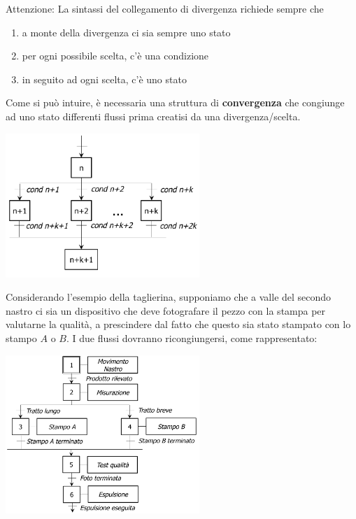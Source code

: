 \documentclass[10pt, letterpaper]{report}
\begin{document}
Attenzione: La sintassi del collegamento di divergenza richiede sempre che \begin{enumerate}
    \item a monte della divergenza ci sia sempre uno stato 
    \item per ogni possibile scelta, c'è una condizione 
    \item in seguito ad ogni scelta, c'è uno stato
\end{enumerate}
Come si può intuire, è necessaria una struttura di \textbf{convergenza} che congiunge ad uno stato differenti flussi prima creatisi da una divergenza/scelta.
\begin{center}
    \includegraphics[width=0.55\textwidth ]{images/convergenza.png}
\end{center}
Considerando l'esempio della taglierina, supponiamo che a valle del secondo nastro ci sia un dispositivo che deve fotografare il pezzo con la stampa per valutarne la qualità, a prescindere dal fatto che questo sia stato stampato con lo stampo $A$ o $B$. I due flussi dovranno ricongiungersi, come rappresentato:
\begin{center}
    \includegraphics[width=0.55\textwidth ]{images/taglierina3.png}
\end{center}
\end{document}
